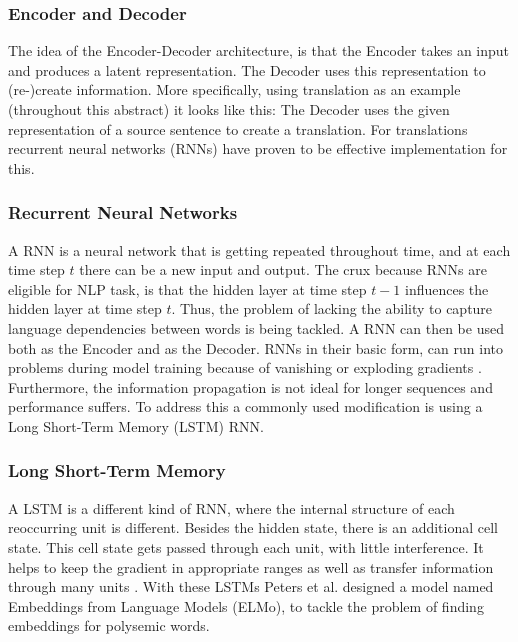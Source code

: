 \documentclass[11pt, a4paper]{amsart}
\begin{document}
\subsubsection{Encoder and Decoder}
The idea of the Encoder-Decoder architecture, is that the Encoder takes an input and produces a latent representation. The Decoder uses this representation to (re-)create information. More specifically, using translation as an example (throughout this abstract) it looks like this: The Decoder uses the given representation of a source sentence to create a translation. For translations recurrent neural networks (RNNs) have proven to be effective implementation for this.

\subsubsection{Recurrent Neural Networks}
A RNN is a neural network that is getting repeated throughout time, and at each time step $t$ there can be a new input and output. The crux because RNNs are eligible for NLP task, is that the hidden layer at time step $t-1$ influences the hidden layer at time step $t$. Thus, the problem of lacking the ability to capture language dependencies between words is being tackled. A RNN can then be used both as the Encoder and as the Decoder. RNNs in their basic form, can run into problems during model training because of vanishing or exploding gradients  \cite{sutskever2014sequence}. Furthermore, the information propagation is not ideal for longer sequences and performance suffers. To address this a commonly used modification is using a Long Short-Term Memory (LSTM) RNN. 

\subsubsection{Long Short-Term Memory}
A LSTM is a different kind of RNN, where the internal structure of each reoccurring unit is different. Besides the hidden state, there is an additional cell state. This cell state gets passed through each unit, with little interference. It helps to keep the gradient in appropriate ranges as well as transfer information through many units \cite{karpathyRNN}. With these LSTMs Peters et al. designed a model named Embeddings from Language Models (ELMo), to tackle the problem of finding embeddings for polysemic words.
\end{document}
